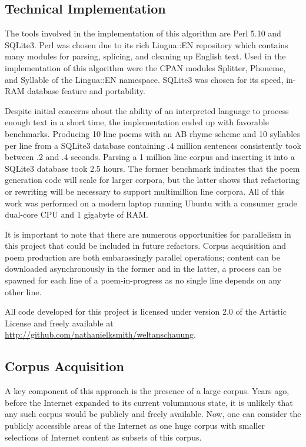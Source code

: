 \documentclass[10pt]{article}
\begin{document}
\subsection{Technical Implementation}
The tools involved in the implementation of this algorithm are Perl
5.10\cite{perl} and SQLite3\cite{sqlite3}. Perl was chosen due to its rich Lingua::EN
repository which contains many modules for parsing, splicing, and cleaning up
English text. Used in the implementation of this algorithm were the CPAN
modules Splitter\cite{splitter}, Phoneme\cite{phoneme}, and
Syllable\cite{syllable} of the Lingua::EN namespace. SQLite3 was
chosen for its speed, in-RAM database feature and portability.

Despite initial concerns about the ability of an interpreted language to
process enough text in a short time, the implementation ended up with favorable
benchmarks. Producing 10 line poems with an AB rhyme scheme and 10 syllables
per line from a SQLite3 database containing .4 million sentences consistently
took between .2 and .4 seconds. Parsing a 1 million line corpus and inserting
it into a SQLite3 database took 2.5 hours. The former benchmark indicates that
the poem generation code will scale for larger corpora, but the latter shows
that refactoring or rewriting will be necessary to support multimillion line
corpora. All of this work was performed on a modern laptop running Ubuntu with
a consumer grade dual-core CPU and 1 gigabyte of RAM.

It is important to note that there are numerous opportunities for parallelism
in this project that could be included in future refactors. Corpus acquisition
and poem production are both embarassingly parallel operations; content can be
downloaded asynchronously in the former and in the latter, a process can be
spawned for each line of a poem-in-progress as no single line depends on any
other line.

All code developed for this project is licensed under version 2.0 of the
Artistic License and freely available at
\url{http://github.com/nathanielksmith/weltanschauung}.

\subsection{Corpus Acquisition}
A key component of this approach is the presence of a large corpus. Years ago,
before the Internet expanded to its current volumnuous state, it is unlikely
that any such corpus would be publicly and freely available. Now, one can
consider the publicly accessible areas of the Internet as one huge corpus with
smaller selections of Internet content as subsets of this corpus.
\end{document}
